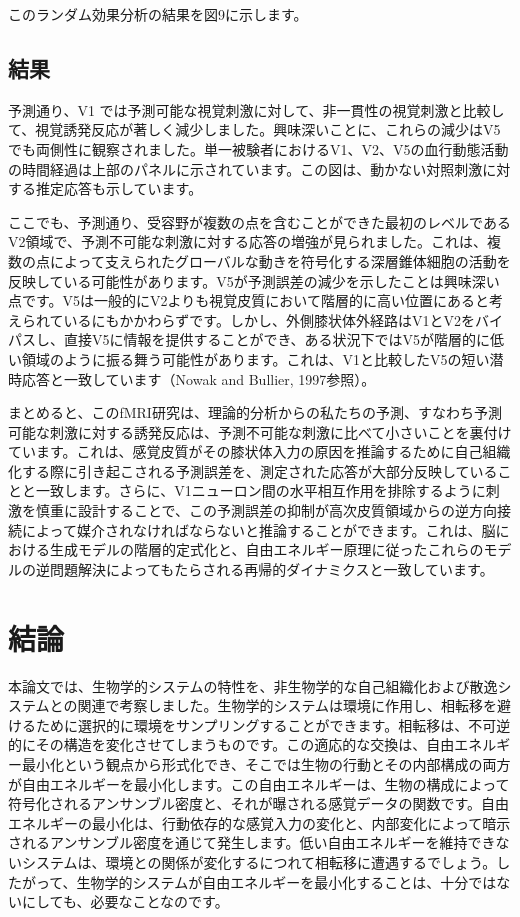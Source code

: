 \documentclass{article}
\begin{document}
このランダム効果分析の結果を図9に示します。

\subsection{結果}
予測通り、V1 では予測可能な視覚刺激に対して、非一貫性の視覚刺激と比較して、視覚誘発反応が著しく減少しました。興味深いことに、これらの減少はV5でも両側性に観察されました。単一被験者におけるV1、V2、V5の血行動態活動の時間経過は上部のパネルに示されています。この図は、動かない対照刺激に対する推定応答も示しています。

ここでも、予測通り、受容野が複数の点を含むことができた最初のレベルであるV2領域で、予測不可能な刺激に対する応答の増強が見られました。これは、複数の点によって支えられたグローバルな動きを符号化する深層錐体細胞の活動を反映している可能性があります。V5が予測誤差の減少を示したことは興味深い点です。V5は一般的にV2よりも視覚皮質において階層的に高い位置にあると考えられているにもかかわらずです。しかし、外側膝状体外経路はV1とV2をバイパスし、直接V5に情報を提供することができ、ある状況下ではV5が階層的に低い領域のように振る舞う可能性があります。これは、V1と比較したV5の短い潜時応答と一致しています（Nowak and Bullier, 1997参照）。

まとめると、このfMRI研究は、理論的分析からの私たちの予測、すなわち予測可能な刺激に対する誘発反応は、予測不可能な刺激に比べて小さいことを裏付けています。これは、感覚皮質がその膝状体入力の原因を推論するために自己組織化する際に引き起こされる予測誤差を、測定された応答が大部分反映していることと一致します。さらに、V1ニューロン間の水平相互作用を排除するように刺激を慎重に設計することで、この予測誤差の抑制が高次皮質領域からの逆方向接続によって媒介されなければならないと推論することができます。これは、脳における生成モデルの階層的定式化と、自由エネルギー原理に従ったこれらのモデルの逆問題解決によってもたらされる再帰的ダイナミクスと一致しています。


\section{結論}
本論文では、生物学的システムの特性を、非生物学的な自己組織化および散逸システムとの関連で考察しました。生物学的システムは環境に作用し、相転移を避けるために選択的に環境をサンプリングすることができます。相転移は、不可逆的にその構造を変化させてしまうものです。この適応的な交換は、自由エネルギー最小化という観点から形式化でき、そこでは生物の行動とその内部構成の両方が自由エネルギーを最小化します。この自由エネルギーは、生物の構成によって符号化されるアンサンブル密度と、それが曝される感覚データの関数です。自由エネルギーの最小化は、行動依存的な感覚入力の変化と、内部変化によって暗示されるアンサンブル密度を通じて発生します。低い自由エネルギーを維持できないシステムは、環境との関係が変化するにつれて相転移に遭遇するでしょう。したがって、生物学的システムが自由エネルギーを最小化することは、十分ではないにしても、必要なことなのです。
\end{document}
